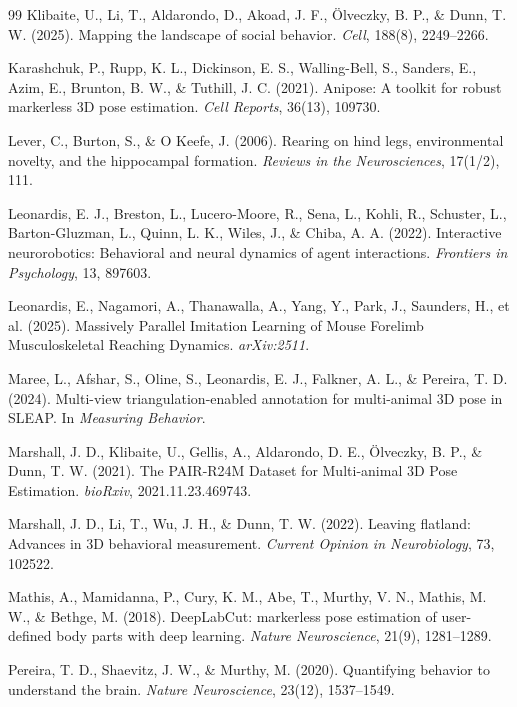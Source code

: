 \documentclass[pdflatex, sn-nature]{sn-jnl}
\theoremstyle{thmstyleone}%
\theoremstyle{thmstyletwo}%
\theoremstyle{thmstylethree}%
\begin{document}
\begin{thebibliography}{99}
 Klibaite, U., Li, T., Aldarondo, D., Akoad, J. F., Ölveczky, B. P., \& Dunn, T. W. (2025). Mapping the landscape of social behavior. \textit{Cell}, 188(8), 2249--2266.

 Karashchuk, P., Rupp, K. L., Dickinson, E. S., Walling-Bell, S., Sanders, E., Azim, E., Brunton, B. W., \& Tuthill, J. C. (2021). Anipose: A toolkit for robust markerless 3D pose estimation. \textit{Cell Reports}, 36(13), 109730.

 Lever, C., Burton, S., \& O Keefe, J. (2006).  Rearing on hind legs, environmental novelty, and the hippocampal formation. \textit{Reviews in the Neurosciences}, 17(1/2), 111.

 Leonardis, E. J., Breston, L., Lucero-Moore, R., Sena, L., Kohli, R., Schuster, L., Barton-Gluzman, L., Quinn,  L. K., Wiles, J., \& Chiba, A. A. (2022). Interactive neurorobotics: Behavioral and neural dynamics of agent interactions. \textit{Frontiers in Psychology}, 13, 897603.

 Leonardis, E., Nagamori, A., Thanawalla, A., Yang, Y., Park, J., Saunders, H., et al. (2025). Massively Parallel Imitation Learning of Mouse Forelimb Musculoskeletal Reaching Dynamics. \textit{arXiv:2511}.

 Maree, L., Afshar, S., Oline, S., Leonardis, E. J., Falkner, A. L., \& Pereira, T. D. (2024). Multi-view triangulation-enabled annotation for multi-animal 3D pose in SLEAP. In \textit{Measuring Behavior}.

 Marshall, J. D., Klibaite, U., Gellis, A., Aldarondo, D. E., Ölveczky, B. P., \& Dunn, T. W. (2021). The PAIR-R24M Dataset for Multi-animal 3D Pose Estimation. \textit{bioRxiv}, 2021.11.23.469743.

 Marshall, J. D., Li, T., Wu, J. H., \& Dunn, T. W. (2022). Leaving flatland: Advances in 3D behavioral measurement. \textit{Current Opinion in Neurobiology}, 73, 102522.

 Mathis, A., Mamidanna, P., Cury, K. M., Abe, T., Murthy, V. N., Mathis, M. W., \& Bethge, M. (2018). DeepLabCut: markerless pose estimation of user-defined body parts with deep learning. \textit{Nature Neuroscience}, 21(9), 1281--1289.

 Pereira, T. D., Shaevitz, J. W., \& Murthy, M. (2020). Quantifying behavior to understand the brain. \textit{Nature Neuroscience}, 23(12), 1537--1549.


\end{thebibliography}
\end{document}
